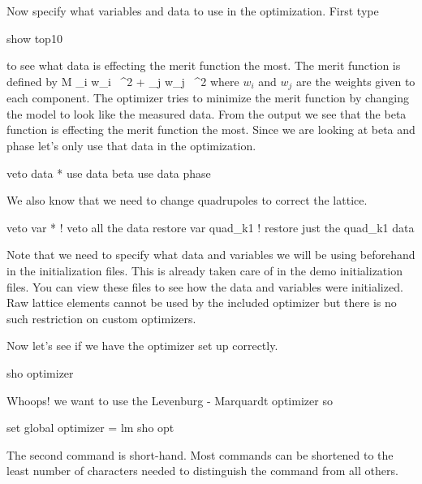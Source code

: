 Now specify what variables and data to use in the optimization. First type
\begin{example}
  show top10
\end{example}
to see what data is effecting the merit function the most. The merit
function is defined by
\Begineq
  {\cal M} \equiv \sum_{i} w_i \,
    ^2 + 
  \sum_{j} w_j \,
    ^2
  \label{eq:merit}
\Endeq
where $w_{i}$ and $w_{j}$ are the weights given to each component.
The optimizer tries to minimize the merit function by changing the
model to look like the measured data. From the  output we
see that the beta function is effecting the merit function the
most. Since we are looking at beta and phase let's only use that data
in the optimization.
\begin{example}
  veto data *
  use  data beta
  use  data phase
\end{example}
We also know that we need to change quadrupoles to correct the lattice.
\begin{example}
  veto var *          ! veto all the data
  restore var quad\_k1 ! restore just the quad\_k1 data
\end{example}
Note that we need to specify what data and variables we will be using
beforehand in the initialization files. This is already taken care of
in the demo initialization files. You can view these files to see how
the data and variables were initialized. Raw lattice elements cannot
be used by the included optimizer but there is no such restriction on
custom optimizers.

Now let's see if we have the optimizer set up correctly.
\begin{example}
  sho optimizer
\end{example}
Whoops! we want to use the Levenburg - Marquardt optimizer so
\begin{example}
  set global optimizer = lm
  sho opt
\end{example}
The second command is short-hand. Most \tao commands can be shortened
to the least number of characters needed to distinguish the command
from all others.

